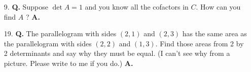 \documentclass[main.tex]{subfiles}
\begin{document}
\begin{enumerate}
    \item [9.] \textbf{Q.} Suppose $\operatorname{det} A=1$ and you know all the cofactors in $C$. How can you find $A$ ? \textbf{A.}
    
    \item [19.] \textbf{Q.} The parallelogram with sides $(2,1)$ and $(2,3)$ has the same area as the parallelogram with sides $(2,2)$ and $(1,3)$. Find those areas from 2 by 2 determinants and say why they must be equal. (I can't see why from a picture. Please write to me if you do.) \textbf{A.}
    
\end{enumerate}
\end{document}
